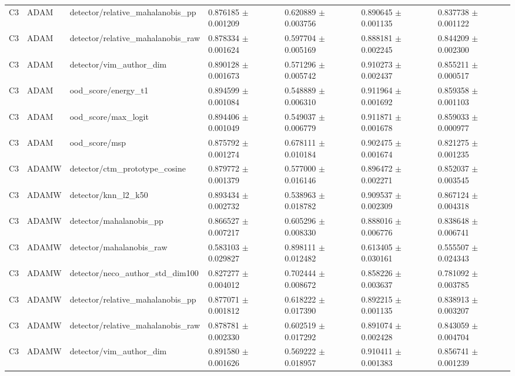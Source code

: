 \begin{longtable}{lllllll}
C3 & ADAM & detector/relative\_mahalanobis\_pp & 0.876185 $\pm$ 0.001209 & 0.620889 $\pm$ 0.003756 & 0.890645 $\pm$ 0.001135 & 0.837738 $\pm$ 0.001122 \\
C3 & ADAM & detector/relative\_mahalanobis\_raw & 0.878334 $\pm$ 0.001624 & 0.597704 $\pm$ 0.005169 & 0.888181 $\pm$ 0.002245 & 0.844209 $\pm$ 0.002300 \\
C3 & ADAM & detector/vim\_author\_dim & 0.890128 $\pm$ 0.001673 & 0.571296 $\pm$ 0.005742 & 0.910273 $\pm$ 0.002437 & 0.855211 $\pm$ 0.000517 \\
C3 & ADAM & ood\_score/energy\_t1 & 0.894599 $\pm$ 0.001084 & 0.548889 $\pm$ 0.006310 & 0.911964 $\pm$ 0.001692 & 0.859358 $\pm$ 0.001103 \\
C3 & ADAM & ood\_score/max\_logit & 0.894406 $\pm$ 0.001049 & 0.549037 $\pm$ 0.006779 & 0.911871 $\pm$ 0.001678 & 0.859033 $\pm$ 0.000977 \\
C3 & ADAM & ood\_score/msp & 0.875792 $\pm$ 0.001274 & 0.678111 $\pm$ 0.010184 & 0.902475 $\pm$ 0.001674 & 0.821275 $\pm$ 0.001235 \\
C3 & ADAMW & detector/ctm\_prototype\_cosine & 0.879772 $\pm$ 0.001379 & 0.577000 $\pm$ 0.016146 & 0.896472 $\pm$ 0.002271 & 0.852037 $\pm$ 0.003545 \\
C3 & ADAMW & detector/knn\_l2\_k50 & 0.893434 $\pm$ 0.002732 & 0.538963 $\pm$ 0.018782 & 0.909537 $\pm$ 0.002309 & 0.867124 $\pm$ 0.004318 \\
C3 & ADAMW & detector/mahalanobis\_pp & 0.866527 $\pm$ 0.007217 & 0.605296 $\pm$ 0.008330 & 0.888016 $\pm$ 0.006776 & 0.838648 $\pm$ 0.006741 \\
C3 & ADAMW & detector/mahalanobis\_raw & 0.583103 $\pm$ 0.029827 & 0.898111 $\pm$ 0.012482 & 0.613405 $\pm$ 0.030161 & 0.555507 $\pm$ 0.024343 \\
C3 & ADAMW & detector/neco\_author\_std\_dim100 & 0.827277 $\pm$ 0.004012 & 0.702444 $\pm$ 0.008672 & 0.858226 $\pm$ 0.003637 & 0.781092 $\pm$ 0.003785 \\
C3 & ADAMW & detector/relative\_mahalanobis\_pp & 0.877071 $\pm$ 0.001812 & 0.618222 $\pm$ 0.017390 & 0.892215 $\pm$ 0.001135 & 0.838913 $\pm$ 0.003207 \\
C3 & ADAMW & detector/relative\_mahalanobis\_raw & 0.878781 $\pm$ 0.002330 & 0.602519 $\pm$ 0.017292 & 0.891074 $\pm$ 0.002428 & 0.843059 $\pm$ 0.004704 \\
C3 & ADAMW & detector/vim\_author\_dim & 0.891580 $\pm$ 0.001626 & 0.569222 $\pm$ 0.018957 & 0.910411 $\pm$ 0.001383 & 0.856741 $\pm$ 0.001239 \\

\end{longtable}

